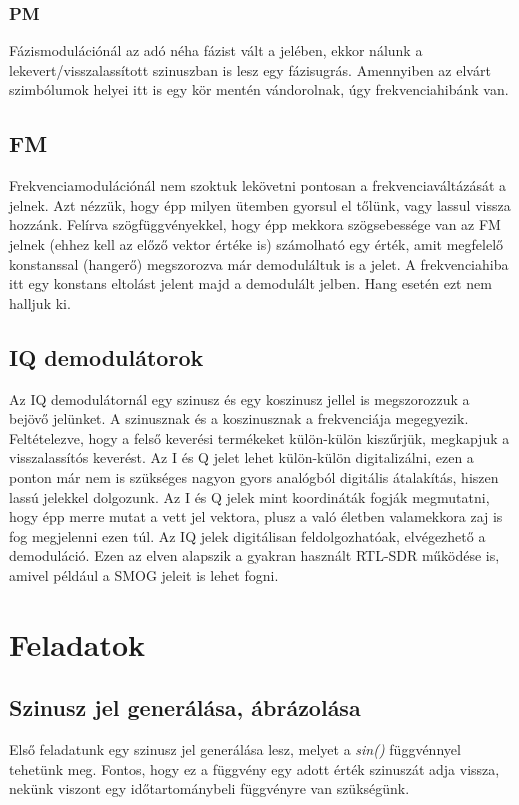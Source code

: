 \documentclass[12pt,a4paper]{article}
\begin{document}
\subsubsection{PM}
Fázismodulációnál az adó néha fázist vált a jelében, ekkor nálunk a lekevert/visszalassított szinuszban is lesz egy fázisugrás. Amennyiben az elvárt szimbólumok helyei itt is egy kör mentén vándorolnak, úgy frekvenciahibánk van.
\subsection{FM}
Frekvenciamodulációnál nem szoktuk lekövetni pontosan a frekvenciaváltázását a jelnek. Azt nézzük, hogy épp milyen ütemben gyorsul el tőlünk, vagy lassul vissza hozzánk. Felírva szögfüggvényekkel, hogy épp mekkora szögsebessége van az FM jelnek (ehhez kell az előző vektor értéke is) számolható egy érték, amit megfelelő konstanssal (hangerő) megszorozva már demoduláltuk is a jelet. A frekvenciahiba itt egy konstans eltolást jelent majd a demodulált jelben. Hang esetén ezt nem halljuk ki.

\subsection{IQ demodulátorok}
Az IQ demodulátornál egy szinusz és egy koszinusz jellel is megszorozzuk a bejövő jelünket. A szinusznak és a koszinusznak a frekvenciája megegyezik. Feltételezve, hogy a felső keverési termékeket külön-külön kiszűrjük, megkapjuk a visszalassítós keverést. Az I és Q jelet lehet külön-külön digitalizálni, ezen a ponton már nem is szükséges nagyon gyors analógból digitális átalakítás, hiszen lassú jelekkel dolgozunk. Az I és Q jelek mint koordináták fogják megmutatni, hogy épp merre mutat a vett jel vektora, plusz a való életben valamekkora zaj is fog megjelenni ezen túl. Az IQ jelek digitálisan feldolgozhatóak, elvégezhető a demoduláció. Ezen az elven alapszik a gyakran használt RTL-SDR működése is, amivel például a SMOG jeleit is lehet fogni.

\section{Feladatok}

\subsection{Szinusz jel generálása, ábrázolása}
Első feladatunk egy szinusz jel generálása lesz, melyet a \textit{sin()} függvénnyel tehetünk meg. Fontos, hogy ez a függvény egy adott érték szinuszát adja vissza, nekünk viszont egy időtartománybeli függvényre van szükségünk. 
\end{document}
